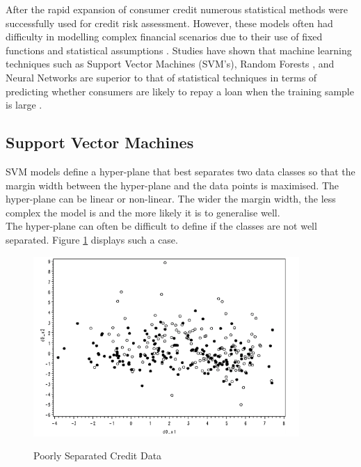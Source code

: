 After the rapid expansion of consumer credit numerous statistical methods were successfully used for credit risk assessment. However, these models often had difficulty in modelling complex financial scenarios due to their use of fixed functions and statistical assumptions \parencite{AICredDefSwap}. Studies have shown that machine learning techniques such as Support Vector Machines (SVM's), Random Forests , and Neural Networks are superior to that of statistical techniques in terms of predicting whether consumers are likely to repay a loan when the training sample is large \parencite{SVMCrook}. 


\subsection{Support Vector Machines}

SVM models define a hyper-plane that best separates two data classes so that the margin width between the hyper-plane and
the data points is maximised. The hyper-plane can be linear or non-linear. The wider the  margin width, the less complex the model is and the more likely it is to generalise well. \\


The hyper-plane can often be difficult to define if the classes are not well separated. Figure \ref{fig:SVM} displays such a case. 

\vspace{10pt}

\begin{figure}[!htb]
\centering
\includegraphics[width = 0.9\textwidth]{images/SVM.png}
\caption{Poorly Separated Credit Data}
\parencite{SVMCrook}
\label{fig:SVM}
\end{figure}

